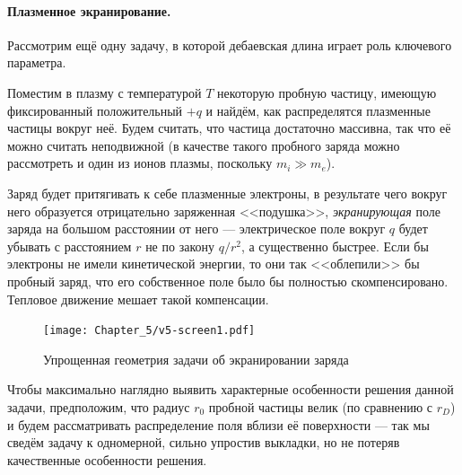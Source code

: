 
\paragraph{Плазменное экранирование.}
Рассмотрим ещё одну задачу, в которой дебаевская длина играет роль
ключевого параметра.

Поместим в плазму с температурой $T$ некоторую пробную частицу, имеющую фиксированный
положительный $+q$ и найдём, как распределятся плазменные частицы вокруг неё.
Будем считать, что частица достаточно массивна, так что её можно
считать неподвижной (в качестве такого пробного заряда можно рассмотреть
и один из ионов плазмы, поскольку $m_i \gg m_e$).

Заряд будет притягивать к себе плазменные электроны, в результате чего
вокруг него образуется отрицательно заряженная <<подушка>>,
\emph{экранирующая} поле заряда на большом расстоянии от него ---
электрическое поле вокруг $q$ будет убывать с расстоянием $r$
не по закону $q/r^2$, а существенно быстрее.
Если бы электроны не имели кинетической энергии, то они так <<облепили>>
бы пробный заряд, что его собственное поле было бы полностью скомпенсировано.
Тепловое движение мешает такой компенсации.

\begin{figure}
\centering\texttt{[image: Chapter\_5/v5-screen1.pdf]}
\caption{Упрощенная геометрия задачи об экранировании заряда}
\end{figure}

Чтобы максимально наглядно выявить характерные особенности решения данной задачи,
предположим, что радиус $r_0$ пробной частицы велик (по сравнению с $r_D$)
и будем рассматривать распределение поля вблизи её поверхности ---
так мы сведём задачу к одномерной, сильно упростив выкладки, но не потеряв
качественные особенности решения.


